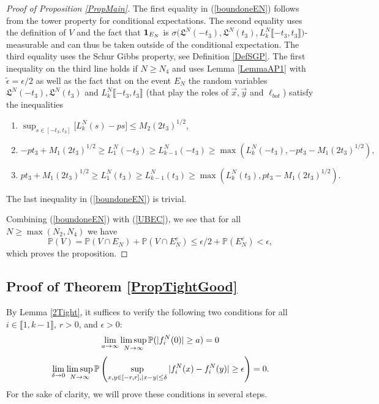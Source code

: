 \begin{proof}[Proof of Proposition \ref{PropMain}]
	The first equality in (\ref{boundoneEN}) follows from the tower property for conditional expectations. The second equality uses the definition of $V$ and the fact that ${\bf 1}_{E_N} $ is $\sigma \big( \mathfrak{L}^N(-t_3),  \mathfrak{L}^N(t_3),L^N_k\llbracket -t_3, t_3\rrbracket   \big)$-measurable and can thus be taken outside of the conditional expectation. The third equality uses the Schur Gibbs property, see Definition \ref{DefSGP}. The first inequality on the third line holds if $N \geq N_4$ and uses Lemma \ref{LemmaAP1} with $\tilde{\epsilon} = \epsilon/2$  as well as the fact that on the event $E_N$ the random variables $\mathfrak{L}^N(-t_3), \mathfrak{L}^N(t_3)$ and $L^N_k \llbracket -t_3, t_3 \rrbracket$ (that play the roles of $\vec{x}, \vec{y}$ and $\ell_{bot}$) satisfy the inequalities 
	\begin{enumerate}
		\item $\sup_{s \in [- t_3,t_3]}\big[L^N_k(s)  - ps \big]  \leq M_2 (2t_3)^{1/2}$,
		\item  $-pt_3 + M_1 (2t_3)^{1/2} \geq  {L}^N_1(-t_3) \geq  {L}^N_{k-1}(-t_3) \geq \max\left(L^N_k(-t_3), -pt_3- M_1 (2t_3)^{1/2}\right),$
		\item $pt_3 + M_1 (2t_3)^{1/2} \geq {L}^N_1(t_3) \geq {L}^N_{k-1}(t_3) \geq  \max \left(L^N_k(t_3),  p t_3- M_1(2t_3)^{1/2} \right).$
	\end{enumerate}
	The last inequality in (\ref{boundoneEN}) is trivial.
	
	Combining (\ref{boundoneEN}) with (\ref{UBEC}), we see that for all $N \geq \max(N_2, N_4)$ we have
	$$\mathbb{P}\left( V  \right) = \mathbb{P}(V \cap E_N) + \mathbb{P}(V \cap E_N^c) \leq \epsilon/2 + \mathbb{P}(E_N^c) < \epsilon,$$
	which proves the proposition.
\end{proof}


%
\subsection{Proof of Theorem \ref{PropTightGood} }\label{Section4.2}

By Lemma \ref{2Tight}, it suffices to verify the following two conditions for all $i \in \llbracket 1,k-1\rrbracket$, $r>0$, and $\epsilon>0$:
\begin{equation}\label{ThmCond1}
\lim_{a\to\infty} \limsup_{N\to\infty} \mathbb{P}(|f^N_i(0)|\geq a) = 0 
\end{equation}
\begin{equation}\label{ThmCond2}
\lim_{\delta\to 0} \limsup_{N\to\infty} \mathbb{P}\left(\sup_{{x,y\in [-r,r], |x-y|\leq\delta}} |f^N_i(x) - f^N_i(y)| \geq \epsilon \right)= 0.
\end{equation}
For the sake of clarity, we will prove these conditions in several steps.\\

